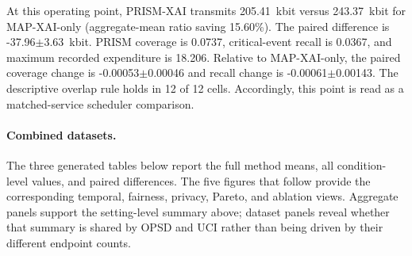 At this operating point, PRISM-XAI transmits 205.41~kbit versus 243.37~kbit for MAP-XAI-only (aggregate-mean ratio saving 15.60\%). The paired difference is -37.96$\pm$3.63~kbit. PRISM coverage is 0.0737, critical-event recall is 0.0367, and maximum recorded expenditure is 18.206. Relative to MAP-XAI-only, the paired coverage change is -0.00053$\pm$0.00046 and recall change is -0.00061$\pm$0.00143. The descriptive overlap rule holds in 12 of 12 cells. Accordingly, this point is read as a matched-service scheduler comparison.

\paragraph{Combined datasets.} The three generated tables below report the full method means, all condition-level values, and paired differences. The five figures that follow provide the corresponding temporal, fairness, privacy, Pareto, and ablation views. Aggregate panels support the setting-level summary above; dataset panels reveal whether that summary is shared by OPSD and UCI rather than being driven by their different endpoint counts.

\begin{table}[p]\centering\tiny

\caption{Public-score threshold $\tau=2$, release cap $M=8$, Combined datasets: complete generated method table.}

\label{tab:thr_2_cap_8:combined:main}

\resizebox{\linewidth}{!}{}

\end{table}\clearpage

\begin{table}[p]\centering\tiny

\caption{Public-score threshold $\tau=2$, release cap $M=8$, Combined datasets: complete condition-level generated table.}

\label{tab:thr_2_cap_8:combined:conditions}

\resizebox{\textwidth}{!}{}

\end{table}\clearpage

\begin{table}[p]\centering\tiny

\caption{Public-score threshold $\tau=2$, release cap $M=8$, Combined datasets: complete generated paired comparisons.}

\label{tab:thr_2_cap_8:combined:paired}

\resizebox{\textwidth}{!}{}

\end{table}\clearpage

